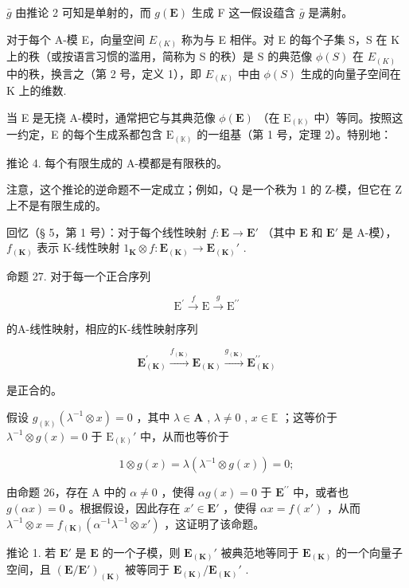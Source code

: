 \(\bar{g}\) 由推论 2 可知是单射的，而 \(g(\mathbf{E})\) 生成 F 这一假设蕴含 \(\bar{g}\) 是满射。

对于每个 A-模 E，向量空间 \(E_{(K)}\) 称为与 E 相伴。对 E 的每个子集 S，S 在 K 上的秩（或按语言习惯的滥用，简称为 S 的秩）是 S 的典范像 \(\phi(S)\) 在 \(E_{(K)}\) 中的秩，换言之（第 2 号，定义 1），即 \(E_{(K)}\) 中由 \(\phi(S)\) 生成的向量子空间在 K 上的维数.

当 E 是无挠 A-模时，通常把它与其典范像 \(\phi(\mathbf{E})\) （在 \(\mathrm{E}_{(\mathbb{K})}\) 中）等同。按照这一约定，E 的每个生成系都包含 \(\mathrm{E}_{(\mathbb{K})}\) 的一组基（第 1 号，定理 2）。特别地：

推论 4. 每个有限生成的 A-模都是有限秩的。

注意，这个推论的逆命题不一定成立；例如，Q 是一个秩为 1 的 Z-模，但它在 Z 上不是有限生成的。

回忆（§ 5，第 1 号）：对于每个线性映射 \(f: \mathbf{E} \to \mathbf{E}'\) （其中 \(\mathbf{E}\) 和 \(\mathbf{E}'\) 是 A-模）， \(f_{(\mathbf{K})}\) 表示 K-线性映射 \(1_{\mathbf{K}} \otimes f: \mathbf{E}_{(\mathbf{K})} \to \mathbf{E}_{(\mathbf{K})}'\) .

命题 27. 对于每一个正合序列

\[
\mathrm{E} ^ {\prime} \xrightarrow {f} \mathrm{E} \xrightarrow {g} \mathrm{E} ^ {\prime \prime}
\]

的A-线性映射，相应的K-线性映射序列

\[
\mathbf {E} _ {(\mathbf {K})} ^ {\prime} \xrightarrow {f _ {(\mathbf {K})}} \mathbf {E} _ {(\mathbf {K})} \xrightarrow {g _ {(\mathbf {K})}} \mathbf {E} _ {(\mathbf {K})} ^ {\prime \prime}
\]

是正合的。

假设 \(g_{(\mathbb{K})}(\lambda^{-1} \otimes x) = 0\) ，其中 \(\lambda \in \mathbf{A}\) , \(\lambda \neq 0\) , \(x \in \mathbb{E}\) ；这等价于 \(\lambda^{-1} \otimes g(x) = 0\) 于 \(\mathrm{E}_{(\mathbb{K})}'\) 中，从而也等价于

\[
1 \otimes g (x) = \lambda (\lambda^ {- 1} \otimes g (x)) = 0;
\]

由命题 26，存在 A 中的 \(\alpha \neq 0\) ，使得 \(\alpha g(x) = 0\) 于 \(\mathbf{E}^{\prime \prime}\) 中，或者也 \(g(\alpha x) = 0\) 。根据假设，因此存在 \(x' \in \mathbf{E}'\) ，使得 \(\alpha x = f(x')\) ，从而 \(\lambda^{-1} \otimes x = f_{(\mathbf{K})}(\alpha^{-1}\lambda^{-1} \otimes x')\) ，这证明了该命题。

推论 1. 若 \(\mathbf{E}'\) 是 \(\mathbf{E}\) 的一个子模，则 \(\mathbf{E}_{(\mathbf{K})}'\) 被典范地等同于 \(\mathbf{E}_{(\mathbf{K})}\) 的一个向量子空间，且 \((\mathbf{E} / \mathbf{E}')_{(\mathbf{K})}\) 被等同于 \(\mathbf{E}_{(\mathbf{K})} / \mathbf{E}_{(\mathbf{K})}'\) .

